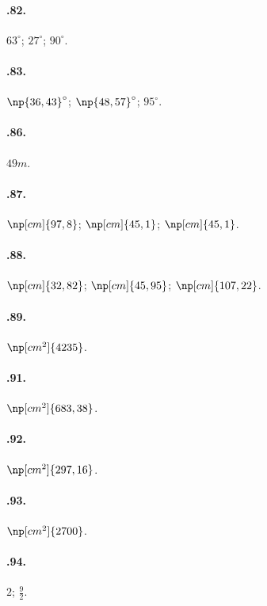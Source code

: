 \begin{multicols}{2}
\paragraph{\thechapter.82.}
$63^{\circ}$; $27^{\circ}$; $90^{\circ}$.

\paragraph{\thechapter.83.}
$\np{36,43}^{\circ}$; $\np{48,57}^{\circ}$; $95^{\circ}$.

\paragraph{\thechapter.86.}
$49\unit{m}$.

\paragraph{\thechapter.87.}
$\np[cm]{97,8}$; $\np[cm]{45,1}$; $\np[cm]{45,1}$.

\paragraph{\thechapter.88.}
$\np[cm]{32,82}$; $\np[cm]{45,95}$; $\np[cm]{107,22}$.

\paragraph{\thechapter.89.}
$\np[cm^2]{4235}$.

\paragraph{\thechapter.91.}
$\np[cm^2]{683,38}$.

\paragraph{\thechapter.92.}
$\np[cm^2]{297,16}$.

\paragraph{\thechapter.93.}
$\np[cm^2]{2700}$.

\paragraph{\thechapter.94.}
$2$; $\frac{9}{2}$.


\end{multicols}
